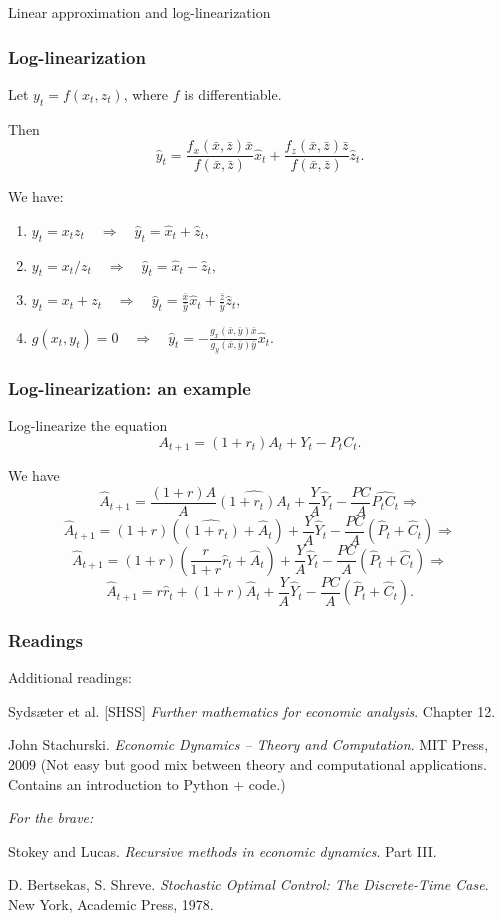 \documentclass[10pt]{beamer}
\theoremstyle{definition}
\begin{document}
\begin{section}{Linear approximation and log-linearization}
\begin{frame} \frametitle{Log-linearization}
Let $y_t=f(x_t,z_t)$, where $f$ is differentiable. \bigskip

Then \begin{equation}\label{eq:mainLLin}
\hat{y}_t = \frac{f_x(\bar{x},\bar{z})\bar{x}}{f(\bar{x},\bar{z})}\hat{x}_t + \frac{f_z(\bar{x},\bar{z})\bar{z}}{f(\bar{x},\bar{z})}\hat{z}_t .
\end{equation}

We have:

\begin{enumerate}\itemsep1em
  \item $y_t=x_t z_t \quad \Rightarrow \quad \hat{y}_t = \hat{x}_t + \hat{z}_t ,$
  \item $y_t=x_t / z_t \quad \Rightarrow \quad \hat{y}_t = \hat{x}_t - \hat{z}_t ,$
  \item $y_t=x_t + z_t \quad \Rightarrow \quad \hat{y}_t = \frac{\bar{x}}{\bar{y}}\hat{x}_t + \frac{\bar{z}}{\bar{y}}\hat{z}_t ,$
  \item $g(x_t,y_t)=0 \quad \Rightarrow \quad \hat{y}_t = - \frac{g_x(\bar{x},\bar{y})\bar{x}}{g_y(\bar{x},\bar{y})\bar{y}}\hat{x}_t .$
\end{enumerate}
\end{frame}


\begin{frame}[fragile]
\frametitle{Log-linearization: an example}
Log-linearize the equation \[ A_{t+1} = (1+r_t)A_t + Y_t - P_t C_t. \] \bigskip \pause

We have \[ \hat{A}_{t+1} = \dfrac{(1+r)A}{A}\widehat{(1+r_t)A_t} + \dfrac{Y}{A}\hat{Y}_t - \dfrac{PC}{A}\widehat{P_t C_t} \Rightarrow \]
\[ \hat{A}_{t+1} = (1+r)(\widehat{(1+r_t)}+\hat{A}_t) + \dfrac{Y}{A}\hat{Y}_t - \dfrac{PC}{A}(\hat{P}_t + \hat{C}_t)  \Rightarrow \]
\[ \hat{A}_{t+1} = (1+r)\left (\dfrac{r}{1+r}\hat{r}_t+\hat{A}_t\right ) + \dfrac{Y}{A}\hat{Y}_t - \dfrac{PC}{A}(\hat{P}_t + \hat{C}_t)  \Rightarrow \]
\[ \hat{A}_{t+1} = r\hat{r}_t + (1+r)\hat{A}_t + \dfrac{Y}{A}\hat{Y}_t - \dfrac{PC}{A}(\hat{P}_t + \hat{C}_t)  . \]
\end{frame}


\end{section}



\begin{frame}[fragile]
\frametitle{Readings}
Additional readings:\bigskip

Syds\ae{}ter et al. [SHSS] \emph{Further mathematics for economic analysis}. Chapter 12.\bigskip

John Stachurski. \emph{Economic Dynamics --  Theory and Computation}. MIT Press, 2009 (Not easy but good mix between theory and computational applications. Contains an introduction to Python + code.)\bigskip

\textit{For the brave:}

Stokey and Lucas. \emph{Recursive methods in economic dynamics}. Part III.\bigskip

D. Bertsekas, S. Shreve. \emph{Stochastic Optimal Control: The Discrete-Time Case}. New York, Academic Press, 1978.\bigskip
\end{frame}
\end{document}
